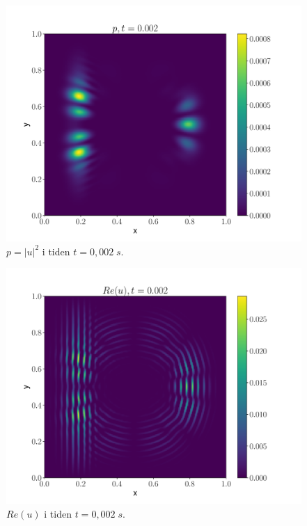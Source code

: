 \documentclass[reprint,english,notitlepage]{revtex4-2}  %
\begin{document}
\begin{figure}[H]
	\centering
	\includegraphics[scale=0.45, trim={-1cm 0 0 0}]{../Images/ImshowUt0002sl2.pdf}
	\caption{$p=|u|^2$ i tiden $t = 0,002 \; s$.}
	\label{Fig:s2u2t02}
\end{figure}

\begin{figure}[H]
	\centering
	\includegraphics[scale=0.45, trim={-1cm 0 0 0}]{../Images/ImshowRe0002sl2.pdf}
	\caption{$Re(u) $ i tiden $t = 0,002 \; s$.}
	\label{Fig:s2Ret02}
\end{figure}
\end{document}
